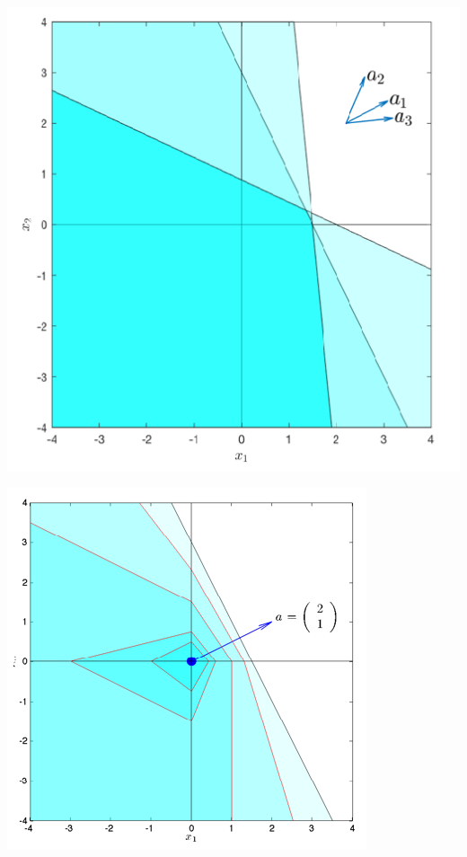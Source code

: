 \documentclass[11 pt]{scrartcl}
\begin{document}
\begin{minipage}{0.5\textwidth}%
    \centering
    \includegraphics[scale=0.7]{scenario_uncertainty.png}
\end{minipage}%
\begin{minipage}{0.47\textwidth}
    \centering
    \includegraphics[scale=0.87]{box_uncertainty.png}
\end{minipage}
\end{document}
